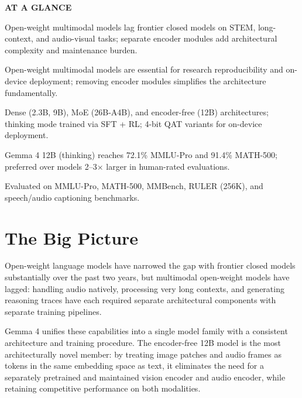 \documentclass[10pt,twocolumn]{article}
\begin{document}
\begin{mdframed}[backgroundcolor=boxgray,linecolor=rulered,linewidth=1pt,
    innerleftmargin=6pt,innerrightmargin=6pt,
    innertopmargin=6pt,innerbottommargin=6pt]
\textbf{\small AT A GLANCE}\par\vspace{4pt}
\begin{description}[leftmargin=0pt,labelsep=4pt,itemsep=2pt,parsep=0pt,
    font=\small\bfseries]
  \item[Problem:] Open-weight multimodal models lag frontier closed
    models on STEM, long-context, and audio-visual tasks; separate
    encoder modules add architectural complexity and maintenance burden.
  \item[Why it matters:] Open-weight multimodal models are essential
    for research reproducibility and on-device deployment; removing
    encoder modules simplifies the architecture fundamentally.
  \item[Method:] Dense (2.3B, 9B), MoE (26B-A4B), and encoder-free
    (12B) architectures; thinking mode trained via SFT + RL; 4-bit QAT
    variants for on-device deployment.
  \item[Result:] Gemma 4 12B (thinking) reaches 72.1\% MMLU-Pro and
    91.4\% MATH-500; preferred over models 2--3$\times$ larger in
    human-rated evaluations.
  \item[Evidence:] Evaluated on MMLU-Pro, MATH-500, MMBench, RULER
    (256K), and speech/audio captioning benchmarks.
\end{description}
\end{mdframed}

\section{The Big Picture}

Open-weight language models have narrowed the gap with frontier closed
models substantially over the past two years, but multimodal open-weight
models have lagged: handling audio natively, processing very long
contexts, and generating reasoning traces have each required
separate architectural components with separate training pipelines.

Gemma 4 unifies these capabilities into a single model family with
a consistent architecture and training procedure.
The encoder-free 12B model is the most architecturally novel member:
by treating image patches and audio frames as tokens in the same
embedding space as text, it eliminates the need for a separately
pretrained and maintained vision encoder and audio encoder,
while retaining competitive performance on both modalities.
\end{document}
